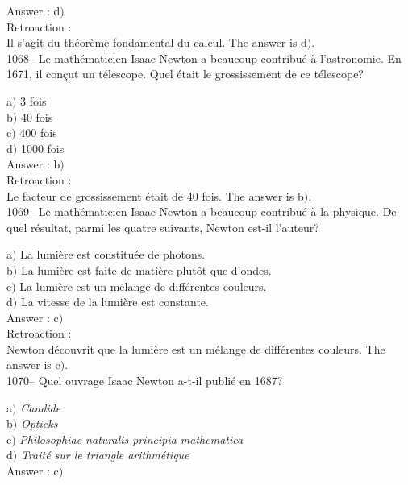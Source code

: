 ﻿\documentclass[letterpaper, 12pt]{article}
\begin{document}
Answer : d$)$ \\

Retroaction : \\
Il s'agit du th\'eor\`eme fondamental du calcul.
The answer is d$)$.\\

1068-- Le math\'ematicien Isaac Newton a beaucoup contribu\'e \`a
l'astronomie. En 1671, il con\c cut un t\'elescope. Quel \'etait le
grossissement de ce t\'elescope?

a$)$ 3 fois \\
b$)$ 40 fois  \\
c$)$ 400 fois  \\
d$)$ 1000 fois \\

Answer : b$)$ \\

Retroaction : \\
Le facteur de grossissement \'etait de 40 fois.
The answer is b$)$.\\

1069-- Le math\'ematicien Isaac Newton a beaucoup contribu\'e \`a la
physique. De quel r\'esultat, parmi les quatre suivants, Newton
est-il l'auteur?

a$)$ La lumi\`ere est constitu\'ee de photons. \\
b$)$ La lumi\`ere est faite de mati\`ere plut\^ot que d'ondes.  \\
c$)$ La lumi\`ere est un \og m\'elange de diff\'erentes couleurs\fg .  \\
d$)$ La vitesse de la lumi\`ere est constante.\\

Answer : c$)$ \\

Retroaction : \\
Newton d\'ecouvrit que la lumi\`ere est un \og m\'elange de
diff\'erentes couleurs\fg .
The answer is c$)$.\\

1070-- Quel ouvrage Isaac Newton a-t-il publi\'e en 1687?

a$)$ {\sl Candide} \\
b$)$ {\sl Opticks}  \\
c$)$ {\sl Philosophiae naturalis principia mathematica}  \\
d$)$ {\sl Trait\'e sur le triangle arithm\'etique}\\

Answer : c$)$\\
\end{document}
